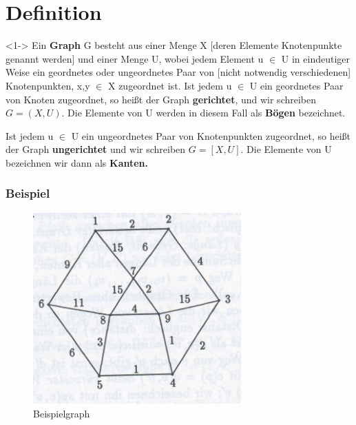 \section{Definition}

\begin{frame}
	\begin{block}<1->{}
				Ein \textbf{Graph} G besteht aus einer Menge X [deren Elemente Knotenpunkte genannt werden] und einer Menge U, wobei jedem Element u $\in$ U in eindeutiger Weise ein geordnetes oder ungeordnetes Paar von [nicht notwendig verschiedenen] Knotenpunkten, x,y $\in$ X zugeordnet ist.
				Ist jedem u $\in$ U ein geordnetes Paar von Knoten zugeordnet, so heißt der Graph \textbf{gerichtet}, und wir schreiben 
				$G= (X, U)$.
				Die Elemente von U werden in diesem Fall als \textbf{Bögen} bezeichnet.

				Ist jedem u $\in$ U ein ungeordnetes Paar von Knotenpunkten zugeordnet, so heißt der Graph \textbf{ungerichtet} und wir schreiben 
				$G=[X,U]$. 
				Die Elemente von U bezeichnen wir dann als \textbf{Kanten.} \\
	\end{block}
\end{frame}

\begin{frame}
\frametitle{Beispiel}
	\begin{figure}[h]
\centering
\includegraphics[width = 8cm]{./pictures/Graph.jpg}
\caption{Beispielgraph %
}
\label{a1}
\end{figure}
\end{frame}
	